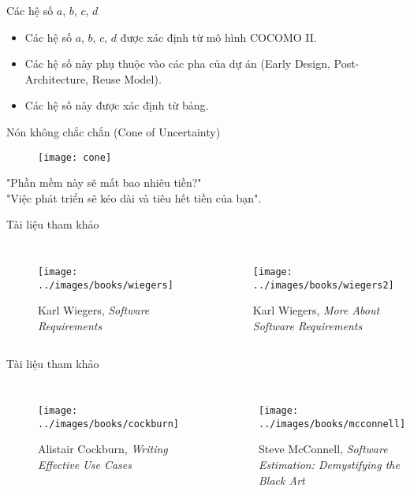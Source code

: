 \documentclass{beamer}
\begin{document}
\begin{frame}{Các hệ số $a$, $b$, $c$, $d$}
    \begin{block}{}
        \begin{itemize}
            \item Các hệ số $a$, $b$, $c$, $d$ được xác định từ
            mô hình COCOMO II.
            \item Các hệ số này phụ thuộc vào các pha của dự án
            (Early Design, Post-Architecture, Reuse Model).
            \item Các hệ số này được xác định từ bảng.
        \end{itemize}
    \end{block}
\end{frame}

\begin{frame}{Nón không chắc chắn (Cone of Uncertainty)}
    \begin{figure}
        \centering
        \texttt{[image: cone]}
    \end{figure}
    \Large\color{red} "Phần mềm này sẽ mất bao nhiêu tiền?"\\
    "Việc phát triển sẽ kéo dài và tiêu hết tiền của bạn".
\end{frame}

\begin{frame}{Tài liệu tham khảo}
    \begin{columns}
        \begin{figure}
            \centering
            \texttt{[image: ../images/books/wiegers]}
            \caption{Karl Wiegers, \emph{Software Requirements}}
        \end{figure}
        \begin{figure}
            \centering
            \texttt{[image: ../images/books/wiegers2]}
            \caption{Karl Wiegers, \emph{More About Software Requirements}}
        \end{figure}
    \end{columns}
\end{frame}

\begin{frame}{Tài liệu tham khảo}
    \begin{columns}
        \begin{figure}
            \centering
            \texttt{[image: ../images/books/cockburn]}
            \caption{Alistair Cockburn, \emph{Writing Effective Use Cases}}
        \end{figure}
        \begin{figure}
            \centering
            \texttt{[image: ../images/books/mcconnell]}
            \caption{Steve McConnell, \emph{Software Estimation: Demystifying the Black Art}}
        \end{figure}
    \end{columns}
\end{frame}
\end{document}
